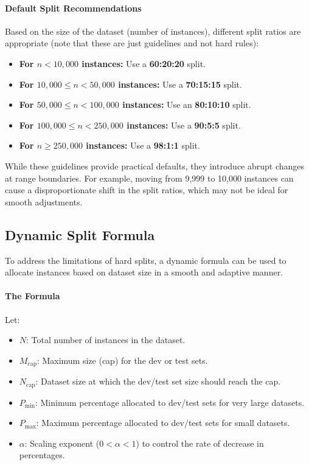 \documentclass[12pt,openany, draft]{book}
\begin{document}
\paragraph{Default Split Recommendations}
Based on the size of the dataset (number of instances), different split ratios are appropriate (note that these are just guidelines and not hard rules):
\begin{itemize}
    \item \textbf{For $n < 10,000$ instances:} Use a \textbf{60:20:20} split.
    \item \textbf{For $10,000 \leq n < 50,000$ instances:} Use a \textbf{70:15:15} split.
    \item \textbf{For $50,000 \leq n < 100,000$ instances:} Use an \textbf{80:10:10} split.
    \item \textbf{For $100,000 \leq n < 250,000$ instances:} Use a \textbf{90:5:5} split.
    \item \textbf{For $n \geq 250,000$ instances:} Use a \textbf{98:1:1} split.
\end{itemize}

While these guidelines provide practical defaults, they introduce abrupt changes at range boundaries. For example, moving from 9,999 to 10,000 instances can cause a disproportionate shift in the split ratios, which may not be ideal for smooth adjustments.

\subsection{Dynamic Split Formula}

To address the limitations of hard splits, a dynamic formula can be used to allocate instances based on dataset size in a smooth and adaptive manner. 

\paragraph{The Formula}
Let:
\begin{itemize}
    \item \(N\): Total number of instances in the dataset.
    \item \(M_{\text{cap}}\): Maximum size (cap) for the dev or test sets.
    \item \(N_{\text{cap}}\): Dataset size at which the dev/test set size should reach the cap.
    \item \(P_{\text{min}}\): Minimum percentage allocated to dev/test sets for very large datasets.
    \item \(P_{\text{max}}\): Maximum percentage allocated to dev/test sets for small datasets.
    \item \(\alpha\): Scaling exponent (\(0 < \alpha < 1\)) to control the rate of decrease in percentages.
\end{itemize} 
\end{document}
